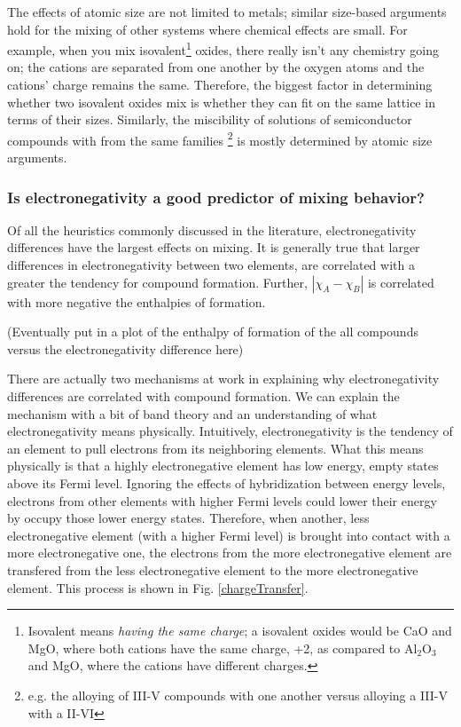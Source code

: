 \documentclass[12pt]{article}
\begin{document}
The effects of atomic size are not limited to metals; similar size-based arguments hold for the mixing of other systems where chemical effects are small. For example, when you mix isovalent\footnote{Isovalent means \emph{having the same charge}; a isovalent oxides would be CaO and MgO, where both cations have the same charge, +2, as compared to Al$_2$O$_3$ and MgO, where the cations have different charges.} oxides, there really isn't any chemistry going on; the cations are separated from one another by the oxygen atoms and the cations' charge remains the same. Therefore, the biggest factor in determining whether two isovalent oxides mix is whether they can fit on the same lattice in terms of their sizes. Similarly, the miscibility of solutions of semiconductor compounds with from the same families \footnote{e.g. the alloying of III-V compounds with one another versus alloying a III-V with a II-VI} is mostly determined by atomic size arguments.

\subsubsection{Is electronegativity a good predictor of mixing behavior?}
Of all the heuristics commonly discussed in the literature, electronegativity differences have the largest effects on mixing.
It is generally true that larger differences in electronegativity between two elements, are correlated with a greater the tendency for compound formation. Further, $|\chi_A - \chi_B|$ is correlated with more negative the enthalpies of formation. 

(Eventually put in a plot of the enthalpy of formation of the all compounds versus the electronegativity difference here)

There are actually two mechanisms at work in explaining why electronegativity differences are correlated with compound formation. We can explain the mechanism with a bit of band theory and an understanding of what electronegativity means physically. Intuitively, electronegativity is the tendency of an element to pull electrons from its neighboring elements. What this means physically is that a highly electronegative element has low energy, empty states above its Fermi level. Ignoring the effects of hybridization between energy levels, electrons from other elements with higher Fermi levels could lower their energy by occupy those lower energy states. Therefore, when another, less electronegative element (with a higher Fermi level) is brought into contact with a more electronegative one, the electrons from the more electronegative element are transfered from the less electronegative element to the more electronegative element. This process is shown in Fig. \ref{chargeTransfer}.
\end{document}
